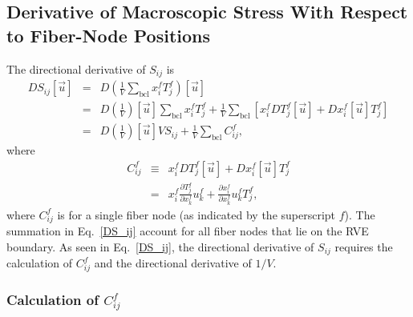 \subsection{Derivative of Macroscopic Stress With Respect to Fiber-Node Positions}

The directional derivative of $S_{ij}$ is
%
\begin{eqnarray}
DS_{ij}[\vec{u}] &=& D\left( \frac{1}{V} \sum_{\text{bcl}} x_i^f T_j^f \right)[\vec{u}] \nonumber\\
%
&=& D \left(\frac{1}{V}\right) [\vec{u}]\sum_{\text{bcl}} x_i^f T_j^f + \frac{1}{V} \sum_{\text{bcl}} \left[ x_i^f D T_j^f[\vec{u}] + D x_i^f  [\vec{u}]  T_j^f \right]\nonumber\\
%
&=& D \left(\frac{1}{V}\right) [\vec{u}] V S_{ij} + \frac{1}{V} \sum_{\text{bcl}}  C_{ij}^f,
\label{DS_ij}
\end{eqnarray}
%
where 
%
\begin{eqnarray}
C_{ij}^f &\equiv&   x_i^f D T_j^f[\vec{u}] + D x_i^f  [\vec{u}]  T_j^f \nonumber\\
&=& x_i^f \frac{\partial T_j^f}{\partial x_k^f} u_k^f + \frac{\partial x_i^f}{\partial x_k^f}u_k^f T_j^f ,
\label{C_ij}
\end{eqnarray}
%
where $C_{ij}^f$ is for a single fiber node (as indicated by the superscript $f$). The summation in Eq.\ \eqref{DS_ij} account for all fiber nodes that lie on the RVE boundary. As seen in Eq.\ \eqref{DS_ij}, the directional derivative of $S_{ij}$ requires the calculation of $C_{ij}^f$ and the directional derivative of $1/V$. 

\subsubsection{Calculation of $C_{ij}^f$}

